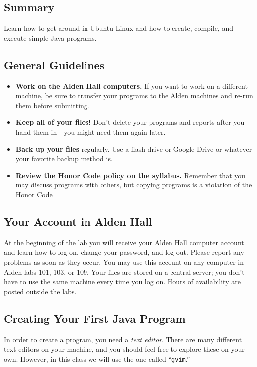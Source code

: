 



\subsection*{Summary}
Learn how to get around in Ubuntu Linux and how to create, 
compile, and execute simple Java programs.

\subsection*{General Guidelines}
\begin{itemize}
\item
{\bf Work on the Alden Hall computers.} If you want to work on a different
machine, be sure to transfer your programs to the Alden
machines and re-run them before submitting.
\item
{\bf Keep all of your files!} Don't delete your programs and reports
after you hand them in---you might need them again later.
\item
{\bf Back up your files} regularly. Use a flash drive or Google Drive or
whatever your favorite backup method is.
\item
{\bf Review the Honor Code policy on the syllabus.} Remember that you
may discuss programs with others, but copying programs is a violation of
the Honor Code
\end{itemize}

\subsection*{Your Account in Alden Hall}
At the beginning of the lab you will receive your Alden Hall computer account and
learn how to log on, change your password, and log out. 
Please report any problems as soon as they occur. You may use this account on
any computer in Alden labs 101, 103, or 109. Your files are stored on a central 
server; you don't have to use the same machine every time you log on. 
Hours of availability are posted outside the labs.

\subsection*{Creating Your First Java Program}
In order to create a program, you need a {\em text editor}. There are
many different text editors on your machine, and  you should feel free
to explore these on your own. However, in this class we will use the one  called ``{\tt gvim}.''

